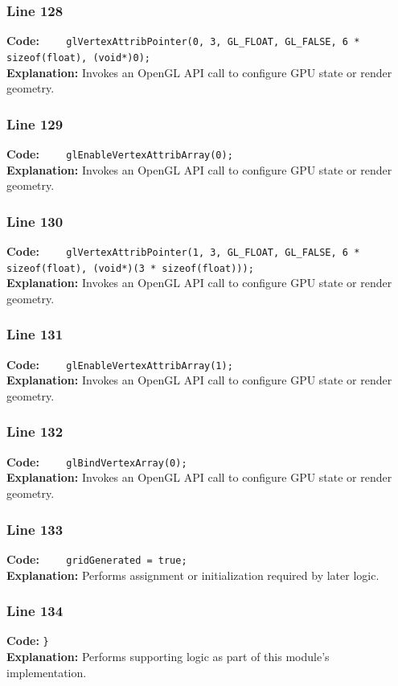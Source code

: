 \documentclass[11pt,a4paper]{article}
\begin{document}
\subsubsection*{Line 128}
\textbf{Code:} \verb|    glVertexAttribPointer(0, 3, GL_FLOAT, GL_FALSE, 6 * sizeof(float), (void*)0);|\\
\textbf{Explanation:} Invokes an OpenGL API call to configure GPU state or render geometry.

\subsubsection*{Line 129}
\textbf{Code:} \verb|    glEnableVertexAttribArray(0);|\\
\textbf{Explanation:} Invokes an OpenGL API call to configure GPU state or render geometry.

\subsubsection*{Line 130}
\textbf{Code:} \verb|    glVertexAttribPointer(1, 3, GL_FLOAT, GL_FALSE, 6 * sizeof(float), (void*)(3 * sizeof(float)));|\\
\textbf{Explanation:} Invokes an OpenGL API call to configure GPU state or render geometry.

\subsubsection*{Line 131}
\textbf{Code:} \verb|    glEnableVertexAttribArray(1);|\\
\textbf{Explanation:} Invokes an OpenGL API call to configure GPU state or render geometry.

\subsubsection*{Line 132}
\textbf{Code:} \verb|    glBindVertexArray(0);|\\
\textbf{Explanation:} Invokes an OpenGL API call to configure GPU state or render geometry.

\subsubsection*{Line 133}
\textbf{Code:} \verb|    gridGenerated = true;|\\
\textbf{Explanation:} Performs assignment or initialization required by later logic.

\subsubsection*{Line 134}
\textbf{Code:} \verb|}|\\
\textbf{Explanation:} Performs supporting logic as part of this module's implementation.
\end{document}
